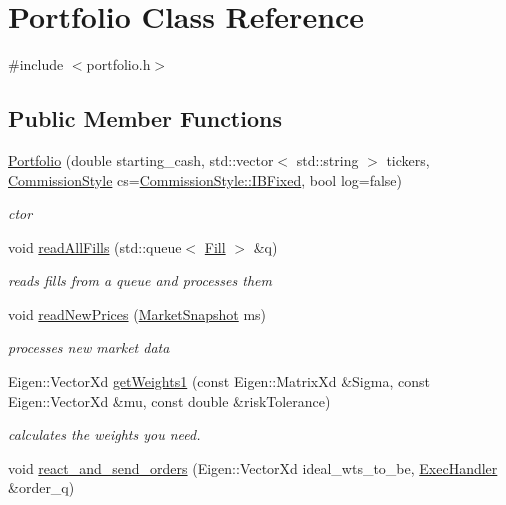 \hypertarget{classPortfolio}{}\section{Portfolio Class Reference}
\label{classPortfolio}


{\ttfamily \#include $<$portfolio.\+h$>$}

\subsection*{Public Member Functions}
\begin{DoxyCompactItemize}
\item 
\hyperlink{classPortfolio_a06e9aac5ff020a789dcdeba2718f11b5}{Portfolio} (double starting\+\_\+cash, std\+::vector$<$ std\+::string $>$ tickers, \hyperlink{pnl__calculator_8h_ad733a3c57302a7ac3408d55dc65f2681}{Commission\+Style} cs=\hyperlink{pnl__calculator_8h_ad733a3c57302a7ac3408d55dc65f2681a4c7c9e42a09b0674cdd86bbbd41b42f3}{Commission\+Style\+::\+I\+B\+Fixed}, bool log=false)
\begin{DoxyCompactList}\small\item\em ctor \end{DoxyCompactList}\item 
void \hyperlink{classPortfolio_aca045221440cf015b8e51f2f4d939745}{read\+All\+Fills} (std\+::queue$<$ \hyperlink{classFill}{Fill} $>$ \&q)
\begin{DoxyCompactList}\small\item\em reads fills from a queue and processes them \end{DoxyCompactList}\item 
void \hyperlink{classPortfolio_aeff3ceffcd454c7479cfef398798f830}{read\+New\+Prices} (\hyperlink{classMarketSnapshot}{Market\+Snapshot} ms)
\begin{DoxyCompactList}\small\item\em processes new market data \end{DoxyCompactList}\item 
Eigen\+::\+Vector\+Xd \hyperlink{classPortfolio_a7a932e1e5b68e8fc8b91d16287f6de30}{get\+Weights1} (const Eigen\+::\+Matrix\+Xd \&Sigma, const Eigen\+::\+Vector\+Xd \&mu, const double \&risk\+Tolerance)
\begin{DoxyCompactList}\small\item\em calculates the weights you need. \end{DoxyCompactList}\item 
void \hyperlink{classPortfolio_a7af1a31a5b6fe1f83c37d8005cc4fd2b}{react\+\_\+and\+\_\+send\+\_\+orders} (Eigen\+::\+Vector\+Xd ideal\+\_\+wts\+\_\+to\+\_\+be, \hyperlink{classExecHandler}{Exec\+Handler} \&order\+\_\+q)

\end{DoxyCompactItemize}
